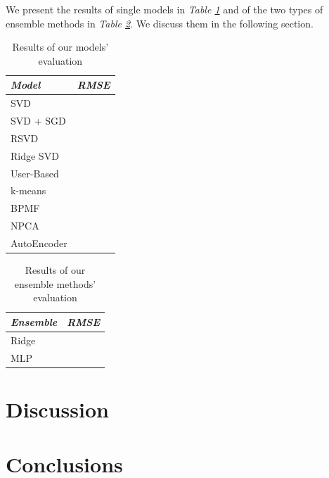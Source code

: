 \documentclass[10pt,conference,compsocconf]{IEEEtran}
\begin{document}
We present the results of single models in \emph{Table \ref{tabres}} and of the two types of ensemble methods in \emph{Table \ref{ensres}}. We discuss them in the following section.

\begin{table}[h!]
	\centering
	\begin{tabular}{l|l}
		\textit{\textbf{Model}} & \textit{\textbf{RMSE}} \\
		\hline
		SVD                     &                        \\
		SVD + SGD               &                        \\
		RSVD       	            &                        \\
		Ridge SVD               &                        \\
		User-Based              &                        \\
		k-means                 &                        \\
		BPMF                    &                        \\
		NPCA                    &                        \\
		AutoEncoder             &                       
	\end{tabular}
\caption{Results of our models' evaluation}
\label{tabres}
\end{table}

\begin{table}[h!]
	\centering
	\begin{tabular}{l|l}
		\textit{\textbf{Ensemble}} & \textit{\textbf{RMSE}} \\
		\hline
		Ridge                     &                        \\
		MLP      	            &                                            
	\end{tabular}
\caption{Results of our ensemble methods' evaluation}
\label{ensres}
\end{table}

\section{Discussion}
\label{disc}


\section{Conclusions}
\label{conc}


\end{document}
